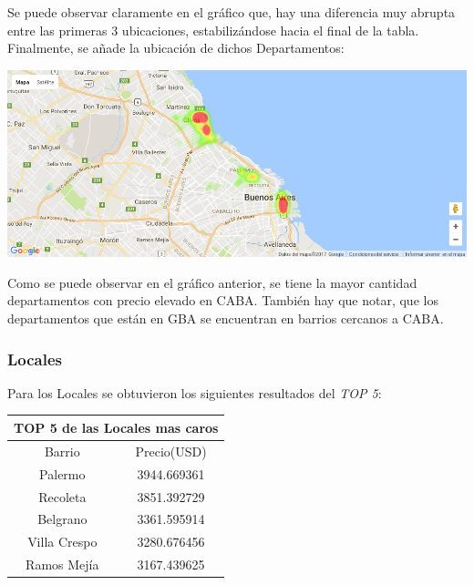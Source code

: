 \documentclass[a4paper, 10pt]{article}
\begin{document}
				Se puede observar claramente en el gráfico que, hay una diferencia muy abrupta entre las primeras 3 ubicaciones, estabilizándose hacia el final de la tabla.\\
				Finalmente, se añade la ubicación de dichos Departamentos:

				\begin{center}
   		    				\includegraphics[width=\textwidth]{images/ubicDc}
				\end{center}

				Como se puede observar en el gráfico anterior, se tiene la mayor cantidad departamentos con precio elevado en CABA. También hay que notar, que los departamentos que están en GBA se encuentran en barrios cercanos a CABA.

				\subsubsection{Locales}

					Para los Locales se obtuvieron los siguientes resultados del \emph{TOP 5}:

					\begin{center}
						\begin{tabular}{ |c|c| }
							\hline
							\multicolumn{2}{|c|}{TOP 5 de las Locales mas caros}\\
							\hline
							\hline
							Barrio & Precio(USD)\\
							\hline
							Palermo & 3944.669361 \\
							Recoleta & 3851.392729 \\
							Belgrano & 3361.595914 \\
							Villa Crespo & 3280.676456 \\
							Ramos Mejía & 3167.439625 \\
							\hline
						\end{tabular}
					\end{center}
\end{document}
